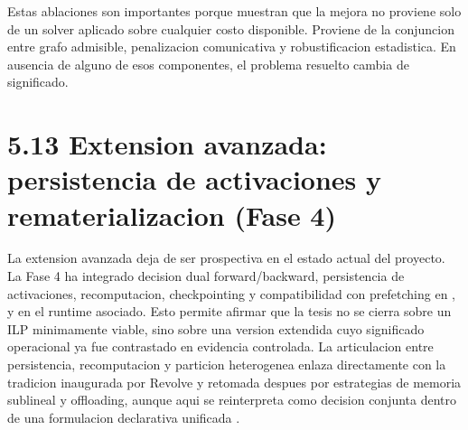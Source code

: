 Estas ablaciones son importantes porque muestran que la mejora no proviene solo de un solver aplicado sobre cualquier costo disponible. Proviene de la conjuncion entre grafo admisible, penalizacion comunicativa y robustificacion estadistica. En ausencia de alguno de esos componentes, el problema resuelto cambia de significado.

\begin{table}[t]
\centering
\caption{Barrido Pareto ILP en el conjunto smoke con comparacion frente a baselines.}
\label{tab:ilp-budget-sweep-sanitized}
\scriptsize
{}
\normalsize
\end{table}

\section{5.13 Extension avanzada: persistencia de activaciones y rematerializacion (Fase 4)}
La extension avanzada deja de ser prospectiva en el estado actual del proyecto. La Fase 4 ha integrado decision dual forward/backward, persistencia de activaciones, recomputacion, checkpointing y compatibilidad con prefetching en ,  y en el runtime asociado. Esto permite afirmar que la tesis no se cierra sobre un ILP minimamente viable, sino sobre una version extendida cuyo significado operacional ya fue contrastado en evidencia controlada. La articulacion entre persistencia, recomputacion y particion heterogenea enlaza directamente con la tradicion inaugurada por Revolve y retomada despues por estrategias de memoria sublineal y offloading, aunque aqui se reinterpreta como decision conjunta dentro de una formulacion declarativa unificada \cite{griewank2000revolve,chen2016sublinear,ren2021zerooffload}.

